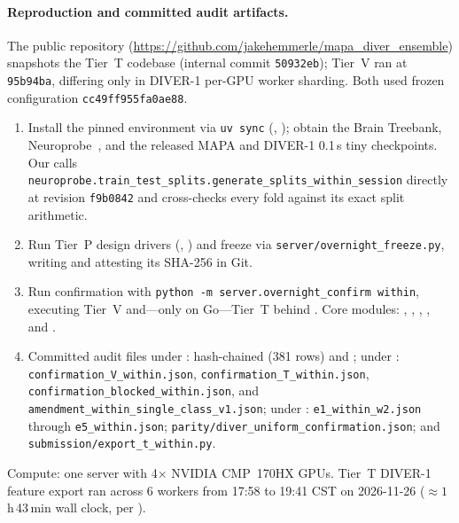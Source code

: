 \documentclass[11pt]{article}
\newcommand{\coderepo}{\url{https://github.com/jakehemmerle/mapa_diver_ensemble}}
\begin{document}
\paragraph{Reproduction and committed audit artifacts.}
The public repository (\coderepo) snapshots the Tier~T codebase (internal commit \texttt{50932eb}); Tier~V ran at \texttt{95b94ba}, differing only in DIVER-1 per-GPU worker sharding. Both used frozen configuration \texttt{cc49ff955fa0ae88}.
\begin{enumerate}\setlength{\itemsep}{2pt}\setlength{\parskip}{0pt}
\item Install the pinned environment via \texttt{uv sync} (, ); obtain the Brain Treebank, Neuroprobe~\cite{neuroprobe-repo}, and the released MAPA and DIVER-1 0.1\,s tiny checkpoints. Our  calls \texttt{neuroprobe.train\_test\_splits.\allowbreak generate\_splits\_within\_session} directly at revision \texttt{f9b0842} and cross-checks every fold against its exact split arithmetic.
\item Run Tier~P design drivers (, ) and freeze via \texttt{server/\allowbreak overnight\_\allowbreak freeze.py}, writing  and attesting its SHA-256 in Git.
\item Run confirmation with \texttt{python -m server.overnight\_confirm within}, executing Tier~V and---only on Go---Tier~T behind . Core modules: , , , , and .
\item {\sloppy Committed audit files under : hash-chained  (381 rows) and ; under : \texttt{confirmation\_\allowbreak V\_within.json}, \texttt{confirmation\_\allowbreak T\_within.json}, \texttt{confirmation\_\allowbreak blocked\_\allowbreak within.json}, and \texttt{amendment\_\allowbreak within\_\allowbreak single\_\allowbreak class\_v1.json}; under : \texttt{e1\_within\_w2.json} through \texttt{e5\_within.json}; \texttt{parity/\allowbreak diver\_\allowbreak uniform\_\allowbreak confirmation.json}; and \texttt{submission/\allowbreak export\_t\_within.py}.\par}
\end{enumerate}
Compute: one server with 4$\times$ NVIDIA CMP~170HX GPUs. Tier~T DIVER-1 feature export ran across 6 workers from 17:58 to 19:41 CST on 2026-11-26 ($\approx 1$\,h\,43\,min wall clock, per ).

{\small


}
\end{document}
